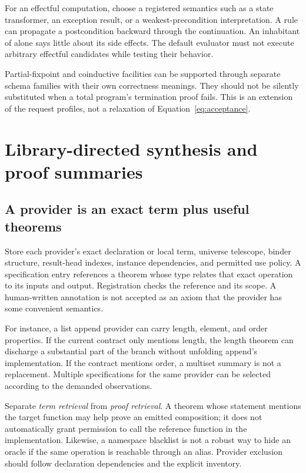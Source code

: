 For an effectful computation, choose a registered semantics such as a state
transformer, an exception result, or a weakest-precondition interpretation.
A  rule can propagate a postcondition backward through the
continuation. An inhabitant of  alone says little about its side
effects. The default evaluator must not execute arbitrary effectful candidates
while testing their behavior.

Partial-fixpoint and coinductive facilities can be supported through separate
schema families with their own correctness meanings. They should not be
silently substituted when a total program's termination proof fails. This is
an extension of the request profiles, not a relaxation of
Equation~\eqref{eq:acceptance}.

\section{Library-directed synthesis and proof summaries}\label{sec:library}

\subsection{A provider is an exact term plus useful theorems}

Store each provider's exact declaration or local term, universe telescope,
binder structure, result-head indexes, instance dependencies, and permitted
use policy. A specification entry references a theorem whose type relates
that exact operation to its inputs and output. Registration checks the
reference and its scope. A human-written annotation is not accepted as an
axiom that the provider has some convenient semantics.

For instance, a list append provider can carry length, element, and order
properties. If the current contract only mentions length, the length theorem
can discharge a substantial part of the branch without unfolding append's
implementation. If the contract mentions order, a multiset summary is not a
replacement. Multiple specifications for the same provider can be selected
according to the demanded observations.

Separate \emph{term retrieval} from \emph{proof retrieval}. A theorem whose
statement mentions the target function may help prove an emitted composition;
it does not automatically grant permission to call the reference function in
the implementation. Likewise, a namespace blacklist is not a robust way to
hide an oracle if the same operation is reachable through an alias. Provider
exclusion should follow declaration dependencies and the explicit inventory.


